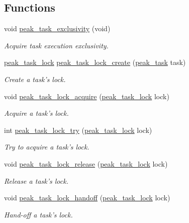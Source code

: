 \subsection*{Functions}
\begin{CompactItemize}
\item 
void \hyperlink{group__task__sync_ga2}{peak\_\-task\_\-exclusivity} (void)
\begin{CompactList}\small\item\em Acquire task execution exclusivity. \item\end{CompactList}\item 
\hyperlink{group__task__sync_ga0}{peak\_\-task\_\-lock} \hyperlink{group__task__sync_ga3}{peak\_\-task\_\-lock\_\-create} (\hyperlink{group__task__common_ga0}{peak\_\-task} task)
\begin{CompactList}\small\item\em Create a task's lock. \item\end{CompactList}\item 
void \hyperlink{group__task__sync_ga4}{peak\_\-task\_\-lock\_\-acquire} (\hyperlink{group__task__sync_ga0}{peak\_\-task\_\-lock} lock)
\begin{CompactList}\small\item\em Acquire a task's lock. \item\end{CompactList}\item 
int \hyperlink{group__task__sync_ga5}{peak\_\-task\_\-lock\_\-try} (\hyperlink{group__task__sync_ga0}{peak\_\-task\_\-lock} lock)
\begin{CompactList}\small\item\em Try to acquire a task's lock. \item\end{CompactList}\item 
void \hyperlink{group__task__sync_ga6}{peak\_\-task\_\-lock\_\-release} (\hyperlink{group__task__sync_ga0}{peak\_\-task\_\-lock} lock)
\begin{CompactList}\small\item\em Release a task's lock. \item\end{CompactList}\item 
void \hyperlink{group__task__sync_ga7}{peak\_\-task\_\-lock\_\-handoff} (\hyperlink{group__task__sync_ga0}{peak\_\-task\_\-lock} lock)
\begin{CompactList}\small\item\em Hand-off a task's lock. \item\end{CompactList}\item 

\end{CompactItemize}
